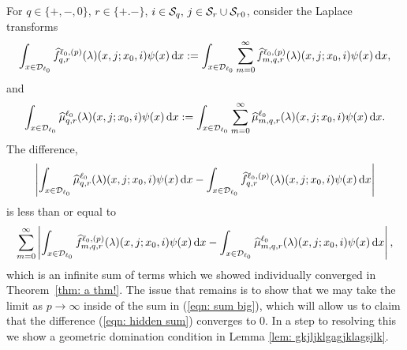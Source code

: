 
For \(q\in\{+,-,0\}\), \(r\in\{+.-\}\), \(i\in\mathcal{S}_q,\,j\in\mathcal{S}_r\cup\mathcal{S}_{r0}\), consider the Laplace transforms 
\[\int_{x\in\mathcal{D}_{\ell_0}} \widehat f^{\ell_0,(p)}_{q,r}(\lambda)(x,j;x_0,i)\psi(x)\, \mathrm{d} x := \int_{x\in\mathcal{D}_{\ell_0}} \sum_{m=0}^\infty \widehat f^{\ell_0,(p)}_{m,q,r}(\lambda)(x,j;x_0,i)\psi(x) \, \mathrm{d} x,\]
and
\[\int_{x\in\mathcal{D}_{\ell_0}} \widehat \mu^{\ell_0}_{q,r}(\lambda)( x,j;x_0,i)\psi(x) \, \mathrm{d} x := \int_{x\in\mathcal{D}_{\ell_0}} \sum_{m=0}^\infty \widehat \mu^{\ell_0}_{m,q,r}(\lambda)( x,j;x_0,i)\psi(x) \, \mathrm{d} x.\]
The difference, 
\begin{align}\left|\int_{x\in\mathcal{D}_{\ell_0}} \widehat \mu^{\ell_0}_{q,r}(\lambda)( x,j;x_0,i)\psi(x)\, \mathrm{d} x  - \int_{x\in\mathcal{D}_{\ell_0}} \widehat f^{\ell_0,(p)}_{q,r}(\lambda)(x,j;x_0,i)\psi(x) \, \mathrm{d} x \right|\label{eqn: hidden sum}\end{align}
is less than or equal to 
\begin{align}\sum_{m=0}^\infty \left| \int_{x\in\mathcal{D}_{\ell_0}} \widehat f^{\ell_0,(p)}_{m,q,r}(\lambda)(x,j;x_0,i)\psi(x)\, \mathrm{d} x - \int_{x\in\mathcal{D}_{\ell_0}}  \widehat \mu^{\ell_0}_{m,q,r}(\lambda)(x,j;x_0,i)\psi(x) \, \mathrm{d} x\right|,\label{eqn: sum big}\end{align}
which is an infinite sum of terms which we showed individually converged in Theorem~\ref{thm: a thm!}. The issue that remains is to show that we may take the limit as \(p\to\infty\) inside of the sum in (\ref{eqn: sum big}), which will allow us to claim that the difference (\ref{eqn: hidden sum}) converges to 0. In a step to resolving this we show a geometric domination condition in Lemma \ref{lem: gkjljklgagjklagsjlk}.  

